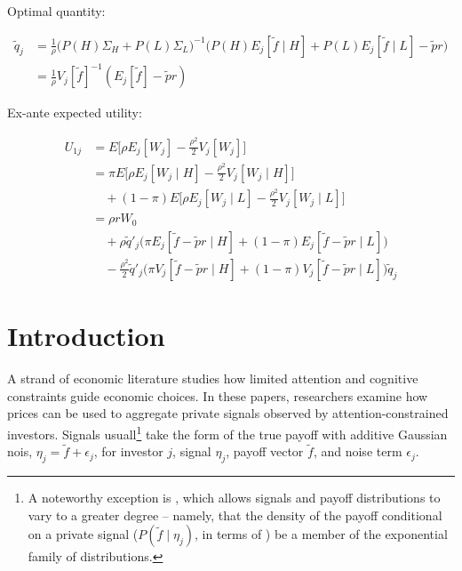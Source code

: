 \documentclass{article}
\begin{document}
Optimal quantity:

\begin{align*}
    \tilde q_j &= \frac1\rho \bigg( P(H) \Sigma_H + P(L) \Sigma_L \bigg)^{-1} \bigg(
        P(H) E_j [\tilde f \mid H] + P(L) E_j [\tilde f \mid L] - \tilde p r
    \bigg) \\
    &= \frac1\rho V_j[\tilde f]^{-1} (E_j [\tilde f] - \tilde p r)
\end{align*}

Ex-ante expected utility:

\begin{align*}
    U_{1j} &= E\biggl[
        \rho E_j [W_j] - \frac{\rho^2}{2} V_j [W_j]
    \biggr] \\
    &= 
        \pi E\biggl[
            \rho E_j [W_j \mid H] - \frac{\rho^2}{2} V_j [W_j \mid H]
        \biggr] \\
        &\quad +
        (1-\pi) E\biggl[
            \rho E_j [W_j \mid L] - \frac{\rho^2}{2} V_j [W_j \mid L]
        \biggr] \\
    &= \rho r W_0 \\
        &\quad + 
        \rho \tilde q'_j \biggl(
            \pi E_j [\tilde f - \tilde p r \mid H] +
            (1-\pi) E_j [\tilde f - \tilde p r \mid L]
        \biggr) \\
        &\quad -
        \frac{\rho^2}{2} \tilde q'_j \biggl(
            \pi V_j [\tilde f - \tilde p r \mid H] +
            (1-\pi) V_j [\tilde f - \tilde p r \mid L]
        \biggr) \tilde q_j
\end{align*}

\newpage

\maketitle

\section{Introduction}

A strand of economic literature studies how limited attention and cognitive constraints guide economic choices. In these papers, researchers examine how prices can be used to aggregate private signals observed by attention-constrained investors. Signals usuall\footnote{A noteworthy exception is \textcite{breon-drish_existence_2015}, which allows signals and payoff distributions to vary to a greater degree -- namely, that the density of the payoff conditional on a private signal ($P(\tilde f \mid \eta_j)$, in terms of \textcite{kacperczyk_rational_2016}) be a member of the exponential family of distributions.} take the form of the true payoff with additive Gaussian nois, $\eta_j = \tilde f + \epsilon_j$, for investor $j$, signal $\eta_j$, payoff vector $\tilde f$, and noise term $\epsilon_j$. 
\end{document}
